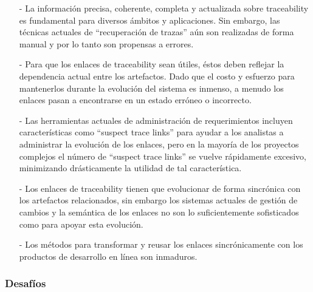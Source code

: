 \documentclass[a4paper,12pt,oneside]{book}
\begin{document}
\begin{itemize}

\item[-]     La información precisa, coherente, completa y actualizada sobre traceability es fundamental para diversos ámbitos y aplicaciones. Sin embargo, las técnicas actuales de “recuperación de trazas” aún son realizadas de forma manual y por lo tanto son propensas a errores.

\item[-]    Para que los enlaces de traceability sean útiles, éstos deben reflejar la dependencia actual entre los artefactos. Dado que el costo y esfuerzo para mantenerlos durante la evolución del sistema es inmenso, a menudo los enlaces pasan a encontrarse en un estado erróneo o incorrecto.

 \item[-]   Las herramientas actuales de administración de requerimientos incluyen características como “suspect trace links” para ayudar a los analistas a administrar la evolución de los enlaces, pero en la mayoría de los proyectos complejos el número de “suspect trace links” se vuelve rápidamente excesivo, minimizando drásticamente la utilidad de tal característica.
 
\item[-]    Los enlaces de traceability tienen que evolucionar de forma sincrónica con los artefactos relacionados, sin embargo los sistemas actuales de gestión de cambios y la semántica de los enlaces no son lo suficientemente sofisticados como para apoyar esta evolución.

\item[-]    Los métodos para transformar y reusar los enlaces sincrónicamente con los productos de desarrollo en línea son inmaduros.

\end{itemize}

\subsubsection{Desafíos}
\end{document}
